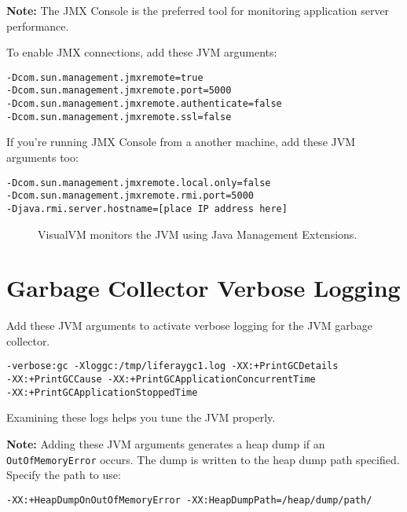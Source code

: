 \noindent\hrulefill

\textbf{Note:} The JMX Console is the preferred tool for monitoring
application server performance.

\noindent\hrulefill

To enable JMX connections, add these JVM arguments:

\begin{verbatim}
-Dcom.sun.management.jmxremote=true
-Dcom.sun.management.jmxremote.port=5000
-Dcom.sun.management.jmxremote.authenticate=false
-Dcom.sun.management.jmxremote.ssl=false
\end{verbatim}

If you're running JMX Console from a another machine, add these JVM
arguments too:

\begin{verbatim}
-Dcom.sun.management.jmxremote.local.only=false
-Dcom.sun.management.jmxremote.rmi.port=5000
-Djava.rmi.server.hostname=[place IP address here]
\end{verbatim}

\begin{figure}
\centering
{}
\caption{VisualVM monitors the JVM using Java Management Extensions.}
\end{figure}

\section{Garbage Collector Verbose
Logging}\label{garbage-collector-verbose-logging}

Add these JVM arguments to activate verbose logging for the JVM garbage
collector.

\begin{verbatim}
-verbose:gc -Xloggc:/tmp/liferaygc1.log -XX:+PrintGCDetails 
-XX:+PrintGCCause -XX:+PrintGCApplicationConcurrentTime 
-XX:+PrintGCApplicationStoppedTime
\end{verbatim}

Examining these logs helps you tune the JVM properly.

\noindent\hrulefill

\textbf{Note:} Adding these JVM arguments generates a heap dump if an
\texttt{OutOfMemoryError} occurs. The dump is written to the heap dump
path specified. Specify the path to use:

\texttt{-XX:+HeapDumpOnOutOfMemoryError\ -XX:HeapDumpPath=/heap/dump/path/}

